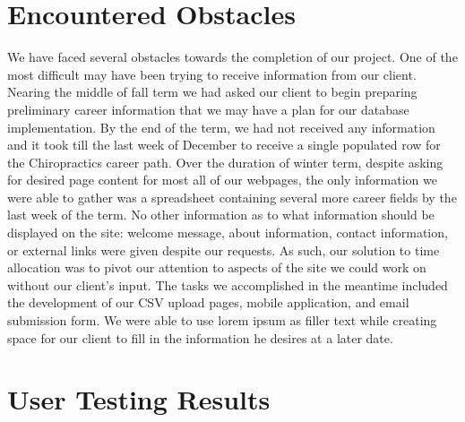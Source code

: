 \documentclass[onecolumn, draftclsnofoot,10pt, compsoc]{IEEEtran}
\begin{document}
\section{Encountered Obstacles}

\noindent We have faced several obstacles towards the completion of our project. One of the most difficult may have been trying to receive information from our client. Nearing the middle of fall term we had asked our client to begin preparing preliminary career information that we may have a plan for our database implementation. By the end of the term, we had not received any information and it took till the last week of December to receive a single populated row for the Chiropractics career path. Over the duration of winter term, despite asking for desired page content for most all of our webpages, the only information we were able to gather was a spreadsheet containing several more career fields by the last week of the term. No other information as to what information should be displayed on the site: welcome message, about information, contact information, or external links were given despite our requests. As such, our solution to time allocation was to pivot our attention to aspects of the site we could work on without our client's input. The tasks we accomplished in the meantime included the development of our CSV upload pages, mobile application, and email submission form. We were able to use lorem ipsum as filler text while creating space for our client to fill in the information he desires at a later date.  

\section{User Testing Results}
\end{document}
